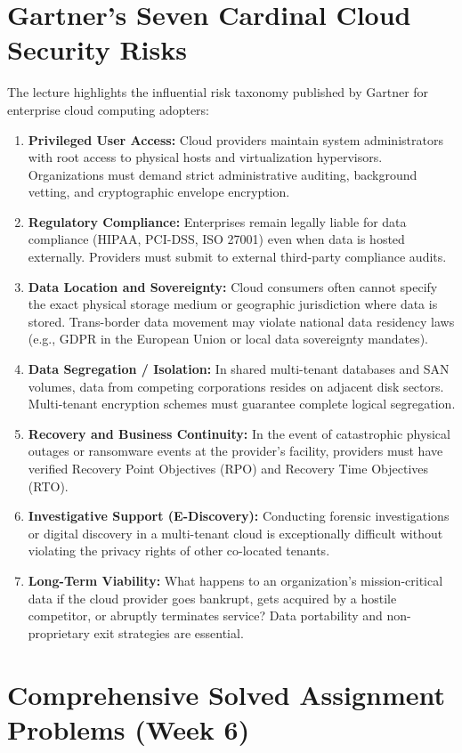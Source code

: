 \documentclass[11pt,a4paper,openany]{report}
\begin{document}
\section{Gartner's Seven Cardinal Cloud Security Risks}
The lecture highlights the influential risk taxonomy published by Gartner for enterprise cloud computing adopters:
\begin{enumerate}[leftmargin=*]
  \item \textbf{Privileged User Access:} Cloud providers maintain system administrators with root access to physical hosts and virtualization hypervisors. Organizations must demand strict administrative auditing, background vetting, and cryptographic envelope encryption.
  \item \textbf{Regulatory Compliance:} Enterprises remain legally liable for data compliance (HIPAA, PCI-DSS, ISO 27001) even when data is hosted externally. Providers must submit to external third-party compliance audits.
  \item \textbf{Data Location and Sovereignty:} Cloud consumers often cannot specify the exact physical storage medium or geographic jurisdiction where data is stored. Trans-border data movement may violate national data residency laws (e.g., GDPR in the European Union or local data sovereignty mandates).
  \item \textbf{Data Segregation / Isolation:} In shared multi-tenant databases and SAN volumes, data from competing corporations resides on adjacent disk sectors. Multi-tenant encryption schemes must guarantee complete logical segregation.
  \item \textbf{Recovery and Business Continuity:} In the event of catastrophic physical outages or ransomware events at the provider's facility, providers must have verified Recovery Point Objectives (RPO) and Recovery Time Objectives (RTO).
  \item \textbf{Investigative Support (E-Discovery):} Conducting forensic investigations or digital discovery in a multi-tenant cloud is exceptionally difficult without violating the privacy rights of other co-located tenants.
  \item \textbf{Long-Term Viability:} What happens to an organization's mission-critical data if the cloud provider goes bankrupt, gets acquired by a hostile competitor, or abruptly terminates service? Data portability and non-proprietary exit strategies are essential.
\end{enumerate}

\section{Comprehensive Solved Assignment Problems (Week 6)}
\end{document}
